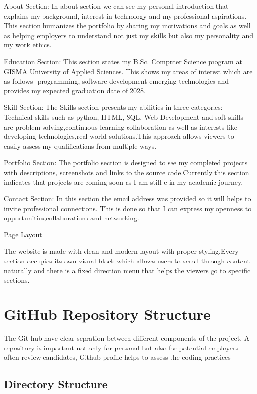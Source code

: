 \documentclass[12pt,a4paper]{article}
\begin{document}
About Section: In about section we can see my personal introduction that explains my background, interest in technology and my professional aspirations. This section humanizes the portfolio by sharing my motivations and goals as well as helping employers to understand not just my skills but also my personality and my work ethics.

Education Section: This section states my B.Sc. Computer Science program at GISMA University of Applied Sciences. This shows my areas of interest which are as follows- programming, software development emerging technologies and provides my expected graduation date of 2028.


Skill Section: The Skills section presents my abilities in three categories: Technical skills such as python, HTML, SQL, Web Development and soft skills are problem-solving,continuous learning collaboration as well as interests like developing technologies,real world solutions.This approach allows viewers to easily assess my qualifications from multiple ways.

Portfolio Section: The portfolio section is designed to see my completed projects with descriptions, screenshots and links to the source code.Currently this section indicates that projects are coming soon as I am still e in my academic journey.

Contact Section: In this section the email address was provided so it will helps to invite professional connections. This is done so that I can express my openness to opportunities,collaborations and networking.

 Page Layout

The website is made with clean and modern layout with proper styling.Every section occupies its own visual block which allows users to scroll through content naturally and there is a fixed direction menu that helps the viewers go to specific sections.

\section{GitHub Repository Structure}

The Git hub have clear sepration between different components of the project. A repository is important not only for personal but also for potential employers often review candidates, Github profile helps to assess the coding practices


\subsection{Directory Structure}
\end{document}
